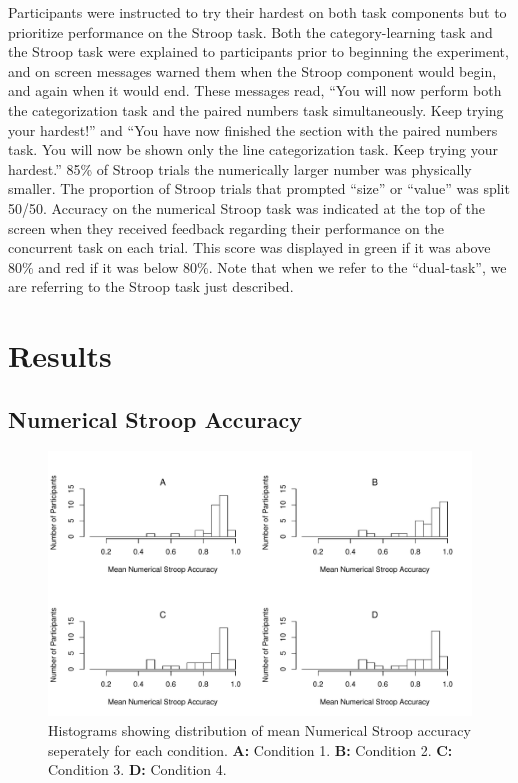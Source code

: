 \documentclass[man,apacite,draftfirst]{apa6} \usepackage{amsmath}
\begin{document}
Participants were instructed to try their hardest on both task components but to
prioritize performance on the Stroop task. Both the category-learning task and
the Stroop task were explained to participants prior to beginning the
experiment, and on screen messages warned them when the Stroop component would
begin, and again when it would end. These messages read, ``You will now perform
both the categorization task and the paired numbers task simultaneously. Keep
trying your hardest!'' and ``You have now finished the section with the paired
numbers task. You will now be shown only the line categorization task. Keep
trying your hardest.'' 85\% of Stroop trials the numerically larger number was
physically smaller. The proportion of Stroop trials that prompted ``size'' or
``value'' was split 50/50. Accuracy on the numerical Stroop task was indicated
at the top of the screen when they received feedback regarding their performance
on the concurrent task on each trial. This score was displayed in green if it
was above 80\% and red if it was below 80\%. Note that when we refer to the
``dual-task'', we are referring to the Stroop task just described.

\section*{Results}
\subsection*{Numerical Stroop Accuracy}
\begin{figure}[t]
\centering \includegraphics[width=1.0\textwidth]{../figures/fig_exc_dual.pdf}
    \caption{ Histograms showing distribution of mean Numerical Stroop accuracy
seperately for each condition. \textbf{A:} Condition 1. \textbf{B:} Condition 2.
\textbf{C:} Condition 3. \textbf{D:} Condition 4. }
    \label{fig:exc_dual}
\end{figure}
\end{document}
